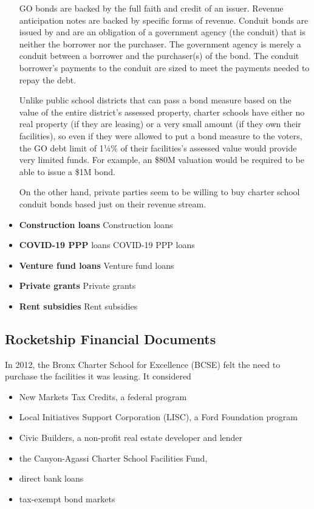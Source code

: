 \begin{itemize}
  GO bonds are backed by the full faith and credit of an issuer.  Revenue anticipation notes are backed by specific forms of revenue. Conduit bonds are issued by and are an obligation of a government agency (the conduit) that is neither the borrower nor the purchaser. The government agency is merely a conduit between a borrower and the purchaser(s) of the bond. The conduit borrower's payments to the conduit are sized to meet the payments needed to repay the debt.

  Unlike public school districts that can pass a bond measure based on the value of the entire district's assessed property, charter schools have either no real property (if they are leasing) or a very small amount (if they own their facilities), so even if they were allowed to put a bond measure to the voters, the GO debt limit of 1¼\% of their facilities's assessed value would provide very limited funds. For example, an \$80M valuation would be required to be able to issue a \$1M bond.

  On the other hand, private parties seem to be willing to buy charter school conduit bonds based just on their revenue stream.
 
  \item \textbf{Construction loans}  Construction loans\\
  \item \textbf{COVID-19 PPP} loans COVID-19 PPP loans\\
  \item \textbf{Venture fund loans} Venture fund loans\\
  \item \textbf{Private grants} Private grants\\
  \item \textbf{Rent subsidies} Rent subsidies\\
\end{itemize}

\subsection{Rocketship Financial Documents}\label{sec:rocketship-financial-docs}\indent

In 2012, the Bronx Charter School for Excellence (BCSE) felt the need to purchase the facilities it was leasing. It considered
\begin{itemize}
  \item New Markets Tax Credits, a federal program
  \item Local Initiatives Support Corporation (LISC), a Ford Foundation program
  \item Civic Builders, a non-profit real estate developer and lender
  \item the Canyon-Agassi Charter School Facilities Fund, 
  \item direct bank loans
  \item tax-exempt bond markets
\end{itemize}\parencite{Clark-Herrera.etal2013}


